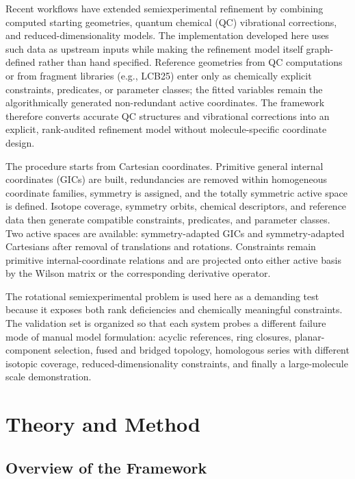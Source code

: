 \documentclass[aip,jcp,reprint,longbibliography,floatfix]{revtex4-2}
\begin{document}
Recent workflows have extended semiexperimental refinement by combining
computed starting geometries, quantum chemical (QC) vibrational corrections, and
reduced-dimensionality models.\cite{Mendolicchio2025FastDvib} The implementation
developed here uses such data as upstream inputs while making the refinement
model itself graph-defined rather than hand specified. Reference geometries
from QC computations or from fragment libraries (e.g.,
LCB25\cite{Lazzari2025LCB25}) enter only as chemically explicit constraints,
predicates, or parameter classes; the fitted variables remain the
algorithmically generated non-redundant active coordinates. The framework
therefore converts accurate QC structures and vibrational corrections into an
explicit, rank-audited refinement model without molecule-specific coordinate
design.

The procedure starts from Cartesian coordinates. Primitive general internal
coordinates (GICs) are built, redundancies are removed within homogeneous coordinate
families, symmetry is assigned, and the totally symmetric active space is defined.
Isotope coverage, symmetry orbits, chemical descriptors, and reference data then generate
compatible constraints, predicates, and parameter classes. Two active spaces
are available: symmetry-adapted GICs and symmetry-adapted Cartesians after
removal of translations and rotations. Constraints remain primitive
internal-coordinate relations and are projected onto either active basis by
the Wilson matrix or the corresponding derivative operator.\cite{Wilson1955}

The rotational semiexperimental problem is used here as a demanding test
because it exposes both rank deficiencies and chemically meaningful
constraints. The validation set is organized so that each system probes a
different failure mode of manual model formulation: acyclic references, ring
closures, planar-component selection, fused and bridged topology, homologous
series with different isotopic coverage, reduced-dimensionality constraints,
and finally a large-molecule scale demonstration.


\section{Theory and Method}

\subsection{Overview of the Framework}
\end{document}
